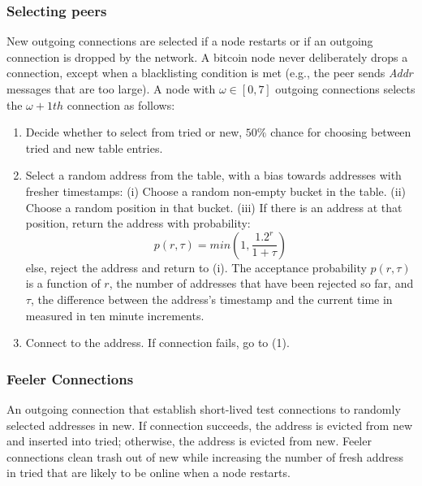 \subsubsection*{Selecting peers}
New outgoing connections are selected if a node restarts or if an outgoing connection is dropped by the network. A bitcoin node never deliberately drops a connection, except when a blacklisting condition is met (e.g., the peer sends \textsl{Addr} messages that are too large).
A node with $\omega \in [0,7]$ outgoing connections selects the $\omega+1th$ connection as follows:
\begin{enumerate}
  \item Decide whether to select from tried or new, $50\%$ chance for choosing between tried and new table entries.
  \item Select a random address from the table, with a bias towards addresses with fresher timestamps: (i) Choose a random non-empty bucket in the table. (ii) Choose a random position in that bucket. (iii) If there is an address at that position, return the address with probability:
  \begin{equation}
    p(r, \tau) = min(1, \dfrac{1.2^{r}}{1+\tau})
  \end{equation}
  else, reject the address and return to (i). The acceptance probability $p(r, \tau)$ is a function of $r$, the number of addresses that have been rejected so far, and $\tau$, the difference between the address’s timestamp and the current time in measured in ten minute increments.
  \item Connect to the address. If connection fails, go to (1).
\end{enumerate}

\subsubsection*{Feeler Connections}
An outgoing connection that establish short-lived test connections to randomly selected addresses in new. If connection succeeds, the address is evicted from new and inserted into tried; otherwise, the address is evicted from new. Feeler connections clean trash out of new while increasing the number of fresh address in tried that are likely to be online when a node restarts.



